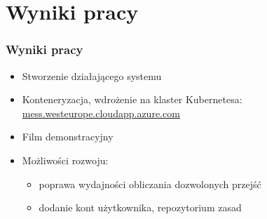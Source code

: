 \documentclass{beamer}
\begin{document}
\section{Wyniki pracy}

\begin{frame}
	\frametitle{Wyniki pracy}
	\begin{itemize}
		\item Stworzenie działającego systemu
		\item Konteneryzacja, wdrożenie na klaster Kubernetesa: \url{mess.westeurope.cloudapp.azure.com}
		\item Film demonstracyjny
		\item Możliwości rozwoju:
		      \begin{itemize}
			      \item poprawa wydajności obliczania dozwolonych przejść
			      \item dodanie kont użytkownika, repozytorium zasad
		      \end{itemize}
	\end{itemize}
\end{frame}





\end{document}
